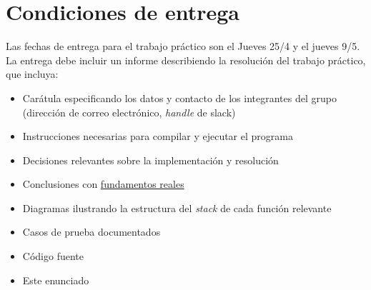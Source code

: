 \documentclass{article}
\begin{document}
\section{Condiciones de entrega}

Las fechas de entrega para el trabajo práctico son el Jueves 25/4 y el jueves 9/5. La entrega debe incluir un informe
describiendo la resolución del trabajo práctico, que incluya:

\begin{itemize}
\item Carátula especificando los datos y contacto de los integrantes del grupo (dirección de correo electrónico, \textit{handle} de slack)
\item Instrucciones necesarias para compilar y ejecutar el programa
\item Decisiones relevantes sobre la implementación y resolución
\item Conclusiones con \underline{fundamentos reales}
\item Diagramas ilustrando la estructura del \textit{stack} de cada función relevante
\item Casos de prueba documentados
\item Código fuente
\item Este enunciado
\end{itemize}
\end{document}
